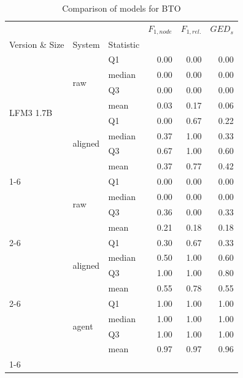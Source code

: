 \begin{table}
\caption{Comparison of models for BTO}
\label{tab:compare_model_BTO}
\begin{tabular}{lllrrr}
\toprule
 &  &  & $F_{1,node}$ & $F_{1,rel.}$ & $GED_{s}$ \\
Version \& Size & System & Statistic &  &  &  \\
\midrule
\multirow[t]{8}{*}{LFM3 1.7B} & \multirow[t]{4}{*}{raw} & Q1 & 0.00 & 0.00 & 0.00 \\
 &  & median & 0.00 & 0.00 & 0.00 \\
 &  & Q3 & 0.00 & 0.00 & 0.00 \\
 &  & mean & 0.03 & 0.17 & 0.06 \\
\cline{2-6}
 & \multirow[t]{4}{*}{aligned} & Q1 & 0.00 & 0.67 & 0.22 \\
 &  & median & 0.37 & 1.00 & 0.33 \\
 &  & Q3 & 0.67 & 1.00 & 0.60 \\
 &  & mean & 0.37 & 0.77 & 0.42 \\
\cline{1-6} \cline{2-6}
\multirow[t]{12}{*}{Qwen3.8 27B} & \multirow[t]{4}{*}{raw} & Q1 & 0.00 & 0.00 & 0.00 \\
 &  & median & 0.00 & 0.00 & 0.00 \\
 &  & Q3 & 0.36 & 0.00 & 0.33 \\
 &  & mean & 0.21 & 0.18 & 0.18 \\
\cline{2-6}
 & \multirow[t]{4}{*}{aligned} & Q1 & 0.30 & 0.67 & 0.33 \\
 &  & median & 0.50 & 1.00 & 0.60 \\
 &  & Q3 & 1.00 & 1.00 & 0.80 \\
 &  & mean & 0.55 & 0.78 & 0.55 \\
\cline{2-6}
 & \multirow[t]{4}{*}{agent} & Q1 & 1.00 & 1.00 & 1.00 \\
 &  & median & 1.00 & 1.00 & 1.00 \\
 &  & Q3 & 1.00 & 1.00 & 1.00 \\
 &  & mean & 0.97 & 0.97 & 0.96 \\
\cline{1-6} \cline{2-6}
\bottomrule
\end{tabular}
\end{table}
